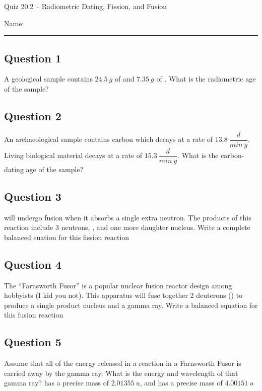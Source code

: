\documentclass[11pt, letterpaper]{memoir}
\begin{document}
	\begin{center}
		{\large	Quiz 20.2 -- Radiometric Dating, Fission, and Fusion}
	\end{center}
	{\large Name: \rule[-1mm]{4in}{.1pt} 

\subsection*{Question 1}
A geological sample contains $24.5~g$ of  and $7.35~g$ of . What is the radiometric age of the sample?

\vspace{6em}
\subsection*{Question 2}
An archaeological sample contains carbon which decays at a rate of $13.8~\dfrac{d}{min~g}$. Living biological material decays at a rate of $15.3~\dfrac{d}{min~g}$. What is the carbon-dating age of the sample?

\vspace{5em}
\subsection*{Question 3}
 will undergo fusion when it absorbs a single extra neutron. The products of this reaction include 3 neutrons, , and one more daughter nucleus. Write a complete balanced euation for this fission reaction

\vspace{3em}
\subsection*{Question 4}
The ``Farnsworth Fusor'' is a popular nuclear fusion reactor design among hobbyists (I kid you not). This apparatus will fuse together 2 deuterons () to produce a single product nucleus and a gamma ray. Write a balanced equation for this fusion reaction

\vspace{3em}
\subsection*{Question 5}
Assume that all of the energy released in a reaction in a Farnsworth Fusor is carried away by the gamma ray. What is the energy and wavelength of that gamma ray?  has a precise mass of $2.01355~u$, and  has a precise mass of $4.00151~u$
	\newpage
	\pagestyle{empty}
	\addtocounter{page}{-1}
\newpage
{}
}
\end{document}
